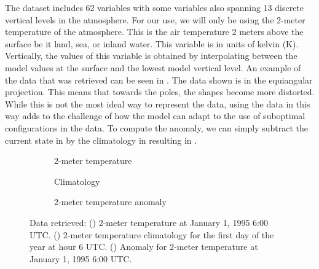 The dataset includes 62 variables with some variables also spanning 13 discrete vertical levels in the atmosphere. For our use, we will only be using the 2-meter temperature of the atmosphere. This is the air temperature 2 meters above the surface be it land, sea, or inland water. This variable is in units of kelvin (K). Vertically, the values of this variable is obtained by interpolating between the model values at the surface and the lowest model vertical level. An example of the data that was retrieved can be seen in . The data shown is in the equiangular projection. This means that towards the poles, the shapes become more distorted. While this is not the most ideal way to represent the data, using the data in this way adds to the challenge of how the model can adapt to the use of suboptimal configurations in the data. To compute the anomaly, we can simply subtract the current state in  by the climatology in  resulting in .
\begin{figure}[H]
  \centering
  \begin{subfigure}{\linewidth}
    \begin{adjustbox}{width=\linewidth}
      
    \end{adjustbox}
    \caption{2-meter temperature}\label{fig:wb2_train_data}
  \end{subfigure}
  \begin{subfigure}{\linewidth}
    \begin{adjustbox}{width=\linewidth}
      
    \end{adjustbox}
    \caption{Climatology}\label{fig:wb2_clim_data}
  \end{subfigure}
  \begin{subfigure}{\linewidth}
    \begin{adjustbox}{width=\linewidth}
      
    \end{adjustbox}
    \caption{2-meter temperature anomaly}\label{fig:wb2_train_anomaly}
  \end{subfigure}
  \caption{Data retrieved: () 2-meter temperature at January 1, 1995 6:00 UTC\@. () 2-meter temperature climatology for the first day of the year at hour 6 UTC\@. () Anomaly for 2-meter temperature at January 1, 1995 6:00 UTC\@.}\label{fig:wb2_data}
\end{figure}

